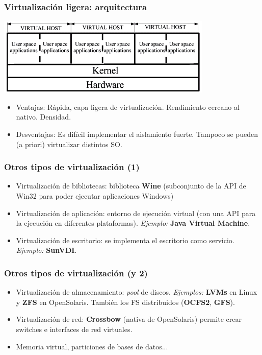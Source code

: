\documentclass{beamer}
\begin{document}
\begin{frame}
\frametitle{Virtualización ligera: arquitectura}
\begin{center}
\includegraphics[scale=0.50,clip=false]{figs/armitage2.png}
\end{center}

\begin{itemize}
\item \alert{Ventajas:} Rápida, capa ligera de virtualización. Rendimiento cercano al nativo. Densidad.
\item \alert{Desventajas:} Es difícil implementar el aislamiento fuerte. Tampoco se pueden (a priori) virtualizar distintos SO.
\end{itemize}

\end{frame}




\begin{frame}
\frametitle{Otros tipos de virtualización (1)}

\begin{itemize}
\item \alert{Virtualización de bibliotecas:} biblioteca \textbf{Wine} (subconjunto de la API de Win32 para poder ejecutar aplicaciones Windows)
\item \alert{Virtualización de aplicación:} entorno de ejecución virtual (con una API para la ejecución en diferentes plataformas). \textit{Ejemplo:} \textbf{Java Virtual Machine}.
\item \alert{Virtualización de escritorio:} se implementa el escritorio como servicio. \textit{Ejemplo:} \textbf{SunVDI}.
\end{itemize}

\end{frame}


\begin{frame}
\frametitle{Otros tipos de virtualización (y 2)}

\begin{itemize}
\item \alert{Virtualización de almacenamiento:} \textit{pool} de discos. \textit{Ejemplos:} \textbf{LVMs} en Linux y \textbf{ZFS} en OpenSolaris. También los FS distribuidos (\textbf{OCFS2}, \textbf{GFS}).
\item \alert{Virtualización de red:} \textbf{Crossbow} (nativa de OpenSolaris) permite crear switches e interfaces de red virtuales.
\item Memoria virtual, particiones de bases de datos...
\end{itemize}

\end{frame}
\end{document}
